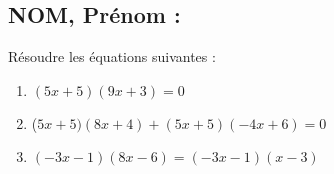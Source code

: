 \documentclass[a4paper,11pt,exos]{nsi}
\begin{document}
\subsection*{NOM, Prénom : \dotfill} 


\maketitle



\begin{exercice}
Résoudre les équations suivantes :

	\begin{enumerate}
		\item $(5x+5)(9x+3)=0$
        \item ($5x+5)( 8x+4)+(5x+5)(-4x+6)=0$
	    \item $(-3x-1)(8x-6)=(-3x-1)(x-3)$
	\end{enumerate}


\end{exercice}

\end{document}
